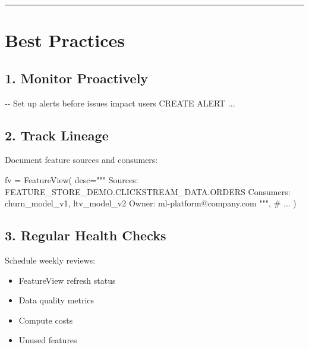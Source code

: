 \documentclass[
  letterpaper,
  DIV=11,
  numbers=noendperiod]{scrreprt}
\newenvironment{Shaded}{\begin{snugshade}}{\end{snugshade}}
\newcommand{\CommentTok}[1]{\textcolor[rgb]{0.37,0.37,0.37}{#1}}
\newcommand{\KeywordTok}[1]{\textcolor[rgb]{0.00,0.23,0.31}{#1}}
\newcommand{\NormalTok}[1]{\textcolor[rgb]{0.00,0.23,0.31}{#1}}
\newcommand{\OperatorTok}[1]{\textcolor[rgb]{0.37,0.37,0.37}{#1}}
\newcommand{\StringTok}[1]{\textcolor[rgb]{0.13,0.47,0.30}{#1}}
\providecommand{\tightlist}{%
  \setlength{\itemsep}{0pt}\setlength{\parskip}{0pt}}\usepackage{longtable,booktabs,array}
\begin{document}
\begin{center}\rule{0.5\linewidth}{0.5pt}\end{center}

\hypertarget{best-practices-9}{%
\section{Best Practices}\label{best-practices-9}}

\hypertarget{monitor-proactively}{%
\subsection{1. Monitor Proactively}\label{monitor-proactively}}

\begin{Shaded}
\begin{Highlighting}[]
\CommentTok{{-}{-} Set up alerts before issues impact users}
\KeywordTok{CREATE}\NormalTok{ ALERT }\OperatorTok{..}\NormalTok{.}
\end{Highlighting}
\end{Shaded}

\hypertarget{track-lineage}{%
\subsection{2. Track Lineage}\label{track-lineage}}

Document feature sources and consumers:

\begin{Shaded}
\begin{Highlighting}[]
\NormalTok{fv }\OperatorTok{=}\NormalTok{ FeatureView(}
\NormalTok{    desc}\OperatorTok{=}\StringTok{"""}
\StringTok{    Sources: FEATURE\_STORE\_DEMO.CLICKSTREAM\_DATA.ORDERS}
\StringTok{    Consumers: churn\_model\_v1, ltv\_model\_v2}
\StringTok{    Owner: ml{-}platform@company.com}
\StringTok{    """}\NormalTok{,}
    \CommentTok{\# ...}
\NormalTok{)}
\end{Highlighting}
\end{Shaded}

\hypertarget{regular-health-checks}{%
\subsection{3. Regular Health Checks}\label{regular-health-checks}}

Schedule weekly reviews:

\begin{itemize}
\tightlist
\item
  FeatureView refresh status
\item
  Data quality metrics
\item
  Compute costs
\item
  Unused features
\end{itemize}
\end{document}
